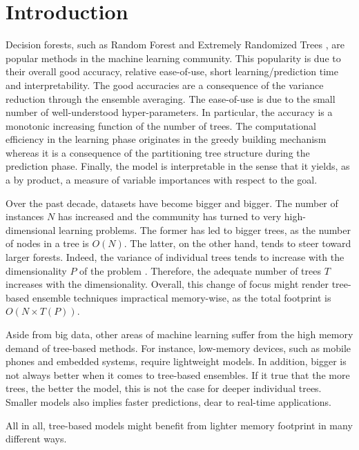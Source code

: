 \documentclass{article}
\begin{document}
\section{Introduction}
\label{sec:introduction}

Decision forests, such as Random Forest \cite{breiman2001random} and Extremely 
Randomized Trees \cite{extratrees}, are popular methods in the machine 
learning community. This popularity is due to their overall good accuracy, 
relative ease-of-use, short learning/prediction time and interpretability. The 
good accuracies are a consequence of the variance reduction through the 
ensemble averaging. The ease-of-use is due to the small number of 
well-understood hyper-parameters. In particular, the accuracy is a monotonic 
increasing function of the number of trees.
The computational efficiency in the learning phase originates in the greedy 
building mechanism whereas it is a consequence of the partitioning tree 
structure during the prediction phase. Finally, the model is interpretable in 
the sense that it yields, as a by product, a measure of variable importances 
with respect to the goal.

Over the past decade, datasets have become bigger and bigger. The number of 
instances $N$ has increased and the community has turned to very 
high-dimensional learning problems. The former has led to bigger trees, as the 
number of nodes in a tree is $O(N)$. The latter, on the other hand, tends to 
steer toward larger forests. Indeed, the variance of individual trees tends to 
increase with the dimensionality $P$ of the problem \cite{l1basedcomp}. 
Therefore, the adequate number of trees $T$ increases with the dimensionality. 
Overall, this change of focus might render tree-based ensemble techniques 
impractical memory-wise, as the total footprint is $O(N \times T(P))$. 

Aside from big data, other areas of machine learning suffer from the high 
memory demand of tree-based methods. For instance, low-memory devices, such as 
mobile phones and embedded systems, require lightweight models. In addition, 
bigger is not always better when it comes to tree-based ensembles.
If it true that the more trees, the better the model, this is not the case for 
deeper individual trees.
Smaller models also implies faster predictions, dear to real-time applications.

All in all, tree-based models might benefit from lighter memory footprint in 
many different ways.
\end{document}
